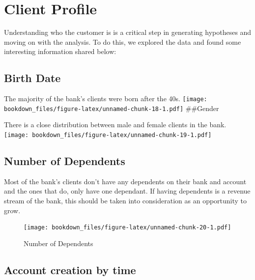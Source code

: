 \documentclass[]{book}
\newenvironment{Shaded}{\begin{snugshade}}{\end{snugshade}}
\newcommand{\KeywordTok}[1]{\textcolor[rgb]{0.13,0.29,0.53}{\textbf{#1}}}
\newcommand{\DataTypeTok}[1]{\textcolor[rgb]{0.13,0.29,0.53}{#1}}
\newcommand{\StringTok}[1]{\textcolor[rgb]{0.31,0.60,0.02}{#1}}
\newcommand{\CommentTok}[1]{\textcolor[rgb]{0.56,0.35,0.01}{\textit{#1}}}
\newcommand{\OperatorTok}[1]{\textcolor[rgb]{0.81,0.36,0.00}{\textbf{#1}}}
\newcommand{\NormalTok}[1]{#1}
\begin{document}
\begin{Shaded}
\end{Shaded}

\chapter{Client Profile}\label{client-profile}

Understanding who the customer is is a critical step in generating
hypotheses and moving on with the analysis. To do this, we explored the
data and found some interesting information shared below:

\section{Birth Date}\label{birth-date}

The majority of the bank's clients were born after the 40s.
\texttt{[image: bookdown\_files/figure-latex/unnamed-chunk-18-1.pdf]}
\#\#Gender

There is a close distribution between male and female clients in the
bank.
\texttt{[image: bookdown\_files/figure-latex/unnamed-chunk-19-1.pdf]}

\section{Number of Dependents}\label{number-of-dependents}

Most of the bank's clients don't have any dependents on their bank and
account and the ones that do, only have one dependant. If having
dependents is a revenue stream of the bank, this should be taken into
consideration as an opportunity to grow.

\begin{figure}
\centering
\texttt{[image: bookdown\_files/figure-latex/unnamed-chunk-20-1.pdf]}
\caption{\label{fig:unnamed-chunk-20}Number of Dependents}
\end{figure}

\section{Account creation by time}\label{account-creation-by-time}
\end{document}
